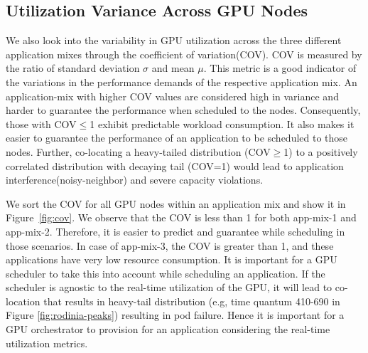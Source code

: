 
\subsection{Utilization Variance Across GPU Nodes}
We also look into the variability in GPU utilization across the three different application mixes through the coefficient of variation(COV). COV is measured by the ratio of standard deviation $\sigma$ and mean $\mu$. This metric is a good indicator of the variations in the performance demands of the respective application mix. An application-mix with higher COV values are considered high in variance and harder to guarantee the performance when scheduled to the nodes. Consequently, those with COV$\leq$1 exhibit predictable workload consumption. It also makes it easier to guarantee the performance of an application to be scheduled to those nodes. Further, co-locating a heavy-tailed distribution (COV$\geq$1) to a positively correlated distribution with decaying tail (COV=1) would lead to application interference(noisy-neighbor) and severe capacity violations.

We sort the COV for all GPU nodes within an application mix and show it in Figure~\ref{fig:cov}. We observe that the COV is less than 1 for both app-mix-1 and app-mix-2. Therefore, it is easier to predict and guarantee while scheduling in those scenarios. In case of app-mix-3, the COV is greater than 1, and these applications have very low resource consumption. It is important for a GPU scheduler to take this into account while scheduling an application. If the scheduler is agnostic to the real-time utilization of the GPU, it will lead to co-location that results in heavy-tail distribution (e.g, time quantum 410-690 in Figure \ref{fig:rodinia-peaks}) resulting in pod failure. Hence it is important for a GPU orchestrator to provision for an application considering the real-time utilization metrics.


